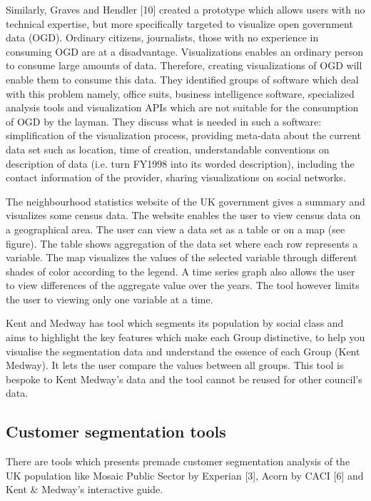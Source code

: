 Similarly, Graves and Hendler [10] created a prototype which allows users with no technical expertise, but more specifically targeted to visualize open government data (OGD). Ordinary citizens, journalists, those with no experience in consuming OGD are at a disadvantage. Visualizations enables an ordinary person to consume large amounts of data. Therefore, creating visualizations of OGD will enable them to consume this data. They identified groups of software which deal with this problem namely, office suits, business intelligence software, specialized analysis tools and visualization APIs which are not suitable for the consumption of OGD by the layman. They discuss what is needed in such a software: simplification of the visualization process, providing meta-data about the current data set such as location, time of creation, understandable conventions on description of data (i.e. turn FY1998 into its worded description), including the contact information of the provider, sharing visualizations on social networks.\par

The neighbourhood statistics website of the UK government gives a summary and visualizes some census data. The website enables the user to view census data on a geographical area. The user can view a data set as a table or on a map (see figure). The table shows aggregation of the data set where each row represents a variable. The map visualizes the values of the selected variable through different shades of color according to the legend. A time series graph also allows the user to view differences of the aggregate value over the years. The tool however limits the user to viewing only one variable at a time.\par


Kent and Medway has tool which segments its population by social class and aims to highlight the key features which make each Group distinctive, to help you visualise the segmentation data and understand the essence of each Group (Kent  Medway). It lets the user compare the values between all groups. This tool is bespoke to Kent  Medway’s data and the tool cannot be reused for other council’s data.\par

\subsection{Customer segmentation tools}

There are tools which presents premade customer segmentation analysis of the UK population like Mosaic Public Sector by Experian [3], Acorn by CACI [6] and Kent \& Medway’s interactive guide. \par

